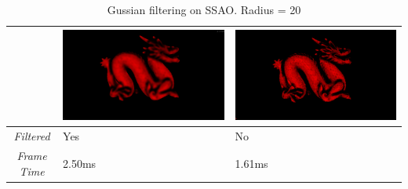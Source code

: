 \begin{table}[!ht]
\begin{center}
\begin{tabular}{| c | p{5cm} | p{5cm} |}
\hline
&
\includegraphics[scale=0.15,trim=0 0 0 -5]{img//results/ssao/dragon-gauss} &
\includegraphics[scale=0.15,trim=0 0 0 -5]{img/results/ssao/dragon-nogauss} \\
\hline
\emph{Filtered} & Yes & No \\
\hline
\emph{Frame Time} & 2.50ms & 1.61ms \\
\hline
\end{tabular}
\caption{Gussian filtering on SSAO. Radius = 20}
\label{table-gauss-ssao}
\end{center}
\end{table}

